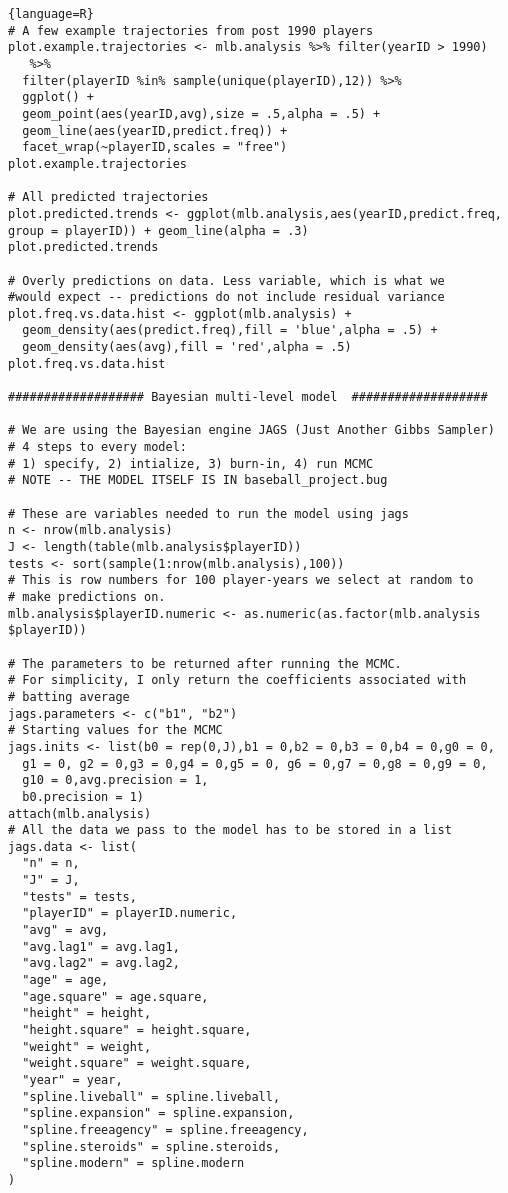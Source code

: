 \begin{lstlisting}{language=R}
# A few example trajectories from post 1990 players
plot.example.trajectories <- mlb.analysis %>% filter(yearID > 1990) 
   %>%
  filter(playerID %in% sample(unique(playerID),12)) %>%
  ggplot() +
  geom_point(aes(yearID,avg),size = .5,alpha = .5) +
  geom_line(aes(yearID,predict.freq)) +
  facet_wrap(~playerID,scales = "free")
plot.example.trajectories

# All predicted trajectories
plot.predicted.trends <- ggplot(mlb.analysis,aes(yearID,predict.freq, 
group = playerID)) + geom_line(alpha = .3) 
plot.predicted.trends

# Overly predictions on data. Less variable, which is what we 
#would expect -- predictions do not include residual variance
plot.freq.vs.data.hist <- ggplot(mlb.analysis) + 
  geom_density(aes(predict.freq),fill = 'blue',alpha = .5) +
  geom_density(aes(avg),fill = 'red',alpha = .5)
plot.freq.vs.data.hist

################### Bayesian multi-level model  ###################

# We are using the Bayesian engine JAGS (Just Another Gibbs Sampler)
# 4 steps to every model:
# 1) specify, 2) intialize, 3) burn-in, 4) run MCMC
# NOTE -- THE MODEL ITSELF IS IN baseball_project.bug

# These are variables needed to run the model using jags
n <- nrow(mlb.analysis)
J <- length(table(mlb.analysis$playerID))
tests <- sort(sample(1:nrow(mlb.analysis),100)) 
# This is row numbers for 100 player-years we select at random to 
# make predictions on.
mlb.analysis$playerID.numeric <- as.numeric(as.factor(mlb.analysis
$playerID))

# The parameters to be returned after running the MCMC. 
# For simplicity, I only return the coefficients associated with 
# batting average
jags.parameters <- c("b1", "b2") 
# Starting values for the MCMC
jags.inits <- list(b0 = rep(0,J),b1 = 0,b2 = 0,b3 = 0,b4 = 0,g0 = 0, 
  g1 = 0, g2 = 0,g3 = 0,g4 = 0,g5 = 0, g6 = 0,g7 = 0,g8 = 0,g9 = 0, 
  g10 = 0,avg.precision = 1, 
  b0.precision = 1)
attach(mlb.analysis)
# All the data we pass to the model has to be stored in a list
jags.data <- list(
  "n" = n,
  "J" = J,
  "tests" = tests,
  "playerID" = playerID.numeric,
  "avg" = avg,
  "avg.lag1" = avg.lag1,
  "avg.lag2" = avg.lag2,
  "age" = age,
  "age.square" = age.square,
  "height" = height,
  "height.square" = height.square,
  "weight" = weight,
  "weight.square" = weight.square,
  "year" = year,
  "spline.liveball" = spline.liveball,
  "spline.expansion" = spline.expansion,
  "spline.freeagency" = spline.freeagency,
  "spline.steroids" = spline.steroids,
  "spline.modern" = spline.modern
)


\end{lstlisting}
